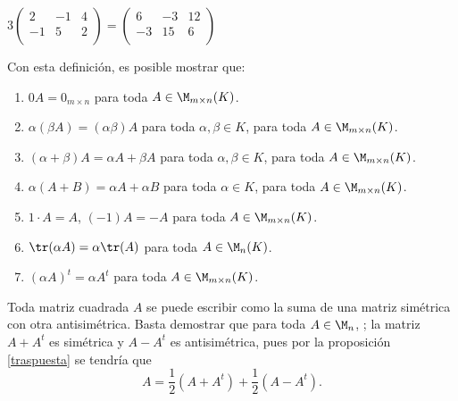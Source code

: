 \begin{ejem}
    $3\begin{pmatrix}
    2 & -1 & 4\\
    -1 & 5 & 2\\
    \end{pmatrix}=\begin{pmatrix}
    6 & -3 & 12\\
    -3 & 15 & 6\\
    \end{pmatrix}$
\end{ejem}

Con esta definici\'on, es posible mostrar que: 

\begin{enumerate}
    \item $0A=0_{m\times n}$ para toda $A\in \M_{m\times n}(K)$.
    \item $\alpha(\beta A)=(\alpha \beta)A$ para toda $\alpha, \beta\in K$, para toda $A\in \M_{m\times n}(K)$.   
    \item $(\alpha+\beta )A=\alpha A +\beta A$ para toda $\alpha, \beta\in K$, para toda $A\in \M_{m\times n}(K)$.
    \item $\alpha(A + B) = \alpha A + \alpha B$ para toda $\alpha \in K$, para toda $A\in \M_{m\times n}(K)$.
    \item $1\cdot A=A$, $(-1)A=-A$ para toda $A\in \M_{m\times n}(K)$.
    \item $\tr(\alpha A)=\alpha \tr(A)$ para toda $A\in \M_{ n}(K)$.
    \item $(\alpha A)^t=\alpha A^t$ para toda $A\in \M_{m\times n}(K)$.
\end{enumerate}

\begin{rmk}
Toda matriz cuadrada $A$ se puede escribir como la suma de una matriz simétrica con otra
antisimétrica. Basta demostrar que para toda $A\in  \M_n $, ; la matriz $ A + A^t$ es simétrica y $A -A^t$
es antisimétrica, pues por la proposici\'on \ref{traspuesta} se tendría que
\[A = \frac{1}{2}(A + A^t)+\frac{1}{2}(A - A^t).\]
\end{rmk}


